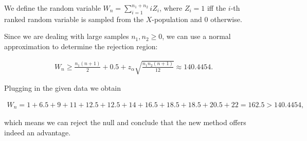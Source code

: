 \begin{solution}
\begin{center}
\end{center}

We define the random variable $W_n = \sum_{i=1}^{n_1+n_2}iZ_i$,
where $Z_i = 1$ iff the $i$-th ranked random variable is sampled from the $X$-population and $0$ otherwise.

Since we are dealing with large samples $n_1, n_2 \geq 0$, we can use a normal approximation to determine the rejection region:

\begin{align*}
    W_n \geq \frac{n_1(n+1)}{2} + 0.5 + z_{\alpha}\sqrt{\frac{n_1n_2(n+1)}{12}}
    \approx  140.4454.
\end{align*}

Plugging in the given data we obtain

\begin{align*}
    W_n = 1 + 6.5 + 9 + 11 + 12.5 + 12.5 + 14 + 16.5 + 18.5 + 18.5 + 20.5 + 22 
    = 162.5 > 140.4454,
\end{align*}

which means we can reject the null and conclude that the new method offers indeed an advantage.

\end{solution}

